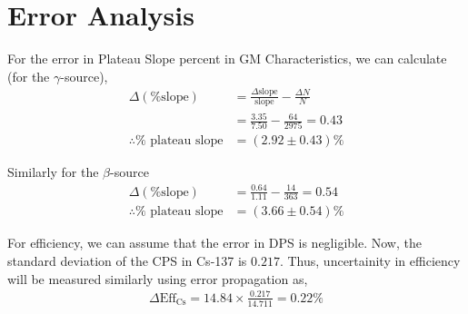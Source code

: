 \section{Error Analysis}
For the error in Plateau Slope percent in GM Characteristics, we can calculate (for the $\gamma$-source),
\begin{align}
    \Delta(\text{\% slope}) &= \frac{\Delta\text{slope}}{\text{slope}} - \frac{\Delta N}{N}\\ &= \frac{3.35}{7.50} - \frac{64}{2975} = 0.43 \nonumber\\
    \therefore \% \text{ plateau slope} &= (2.92 \pm 0.43)\% \nonumber
\end{align}

Similarly for the $\beta$-source
\begin{align*}
    \Delta(\text{\% slope}) &= \frac{0.64}{1.11} - \frac{14}{363} = 0.54\\
    \therefore \% \text{ plateau slope} &= (3.66 \pm 0.54)\%
\end{align*}

For efficiency, we can assume that the error in DPS is negligible. Now, the standard deviation of the CPS in Cs-137 is $0.217$. Thus, uncertainity in  efficiency will be measured similarly using error propagation as,
\begin{align*}
    \Delta\text{Eff}_\text{Cs} = 14.84 \times \frac{0.217}{14.711}=0.22\%
\end{align*}
